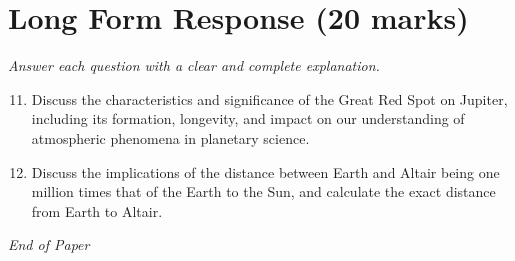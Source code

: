 \documentclass[12pt]{article}
\begin{document}
\section*{Long Form Response (20 marks)}
\textit{Answer each question with a clear and complete explanation.}
\begin{enumerate}[label=\arabic*.]
\setcounter{enumi}{10}
\item Discuss the characteristics and significance of the Great Red Spot on Jupiter, including its formation, longevity, and impact on our understanding of atmospheric phenomena in planetary science.
\item Discuss the implications of the distance between Earth and Altair being one million times that of the Earth to the Sun, and calculate the exact distance from Earth to Altair.
\end{enumerate}

\vfill
\noindent\textit{End of Paper}
\end{document}
